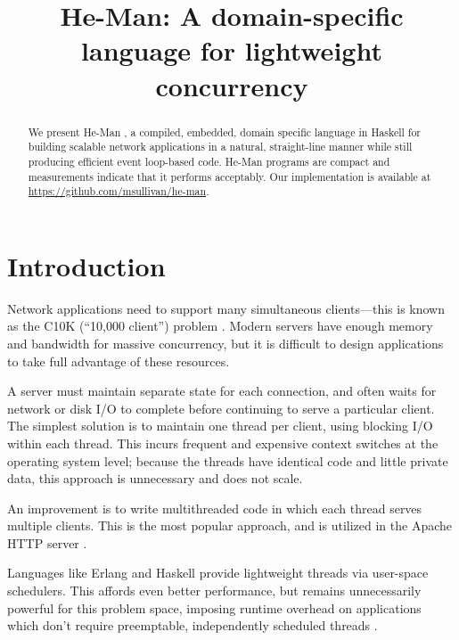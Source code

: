 \documentclass[preprint]{sigplanconf}
\title{He-Man: A domain-specific language for lightweight concurrency}
\begin{document}
\maketitle


\begin{abstract}

We present He-Man \cite{HeMan}, a compiled, embedded, domain specific language in Haskell for
building scalable network applications in a natural, straight-line manner while
still producing efficient event loop-based code. He-Man programs are compact and
measurements indicate that it performs acceptably. Our implementation is
available at
\url{https://github.com/msullivan/he-man}.
\end{abstract}

\section{Introduction}

Network applications need to support many simultaneous clients---this is known
as the C10K (``10,000 client'') problem \cite{Kegel}. Modern servers have enough
memory and bandwidth for massive concurrency, but it is difficult to design
applications to take full advantage of these resources.

A server must maintain separate state for each connection, and often waits for
network or disk I/O to complete before continuing to serve a particular client.
The simplest solution is to maintain one thread per client, using blocking I/O
within each thread. This incurs frequent and expensive context switches at the
operating system level; because the threads have identical code and little
private data, this approach is unnecessary and does not scale.

An improvement is to write multithreaded code in which each thread serves
multiple clients. This is the most popular approach, and is utilized in the
Apache HTTP server \cite{Apache}.

Languages like Erlang and Haskell provide lightweight threads via user-space
schedulers. This affords even better performance, but remains unnecessarily
powerful for this problem space, imposing runtime overhead on applications which
don't require preemptable, independently scheduled threads \cite{Vinoski}.
\end{document}
